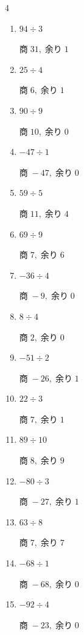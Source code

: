 \begin{multicols}{4}
\begin{enumerate}
  \item $94 \div 3$

        $商\; 31,\; 余り\; 1$

  \item $25 \div 4$

        $商\; 6,\; 余り\; 1$

  \item $90 \div 9$

        $商\; 10,\; 余り\; 0$

  \item $-47 \div 1$

        $商\; -47,\; 余り\; 0$

  \item $59 \div 5$

        $商\; 11,\; 余り\; 4$

  \item $69 \div 9$

        $商\; 7,\; 余り\; 6$

  \item $-36 \div 4$

        $商\; -9,\; 余り\; 0$

\columnbreak %

  \item $8 \div 4$

        $商\; 2,\; 余り\; 0$

  \item $-51 \div 2$

        $商\; -26,\; 余り\; 1$

  \item $22 \div 3$

        $商\; 7,\; 余り\; 1$

  \item $89 \div 10$

        $商\; 8,\; 余り\; 9$

  \item $-80 \div 3$

        $商\; -27,\; 余り\; 1$

  \item $63 \div 8$

        $商\; 7,\; 余り\; 7$

  \item $-68 \div 1$

        $商\; -68,\; 余り\; 0$

  \item $-92 \div 4$

        $商\; -23,\; 余り\; 0$


\end{enumerate}
\end{multicols}
